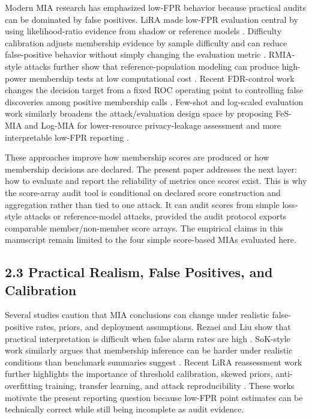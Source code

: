 \documentclass[
  10pt,
  twocolumn]{article}
\begin{document}
Modern MIA research has emphasized low-FPR behavior because practical audits can be dominated by false positives. LiRA made low-FPR evaluation central by using likelihood-ratio evidence from shadow or reference models \cite{ref-3}. Difficulty calibration adjusts membership evidence by sample difficulty and can reduce false-positive behavior without simply changing the evaluation metric \cite{ref-4}. RMIA-style attacks further show that reference-population modeling can produce high-power membership tests at low computational cost \cite{ref-5}. Recent FDR-control work changes the decision target from a fixed ROC operating point to controlling false discoveries among positive membership calls \cite{ref-19}. Few-shot and log-scaled evaluation work similarly broadens the attack/evaluation design space by proposing FeS-MIA and Log-MIA for lower-resource privacy-leakage assessment and more interpretable low-FPR reporting \cite{ref-23}.

These approaches improve how membership scores are produced or how membership decisions are declared. The present paper addresses the next layer: how to evaluate and report the reliability of metrics once scores exist. This is why the score-array audit tool is conditional on declared score construction and aggregation rather than tied to one attack. It can audit scores from simple loss-style attacks or reference-model attacks, provided the audit protocol exports comparable member/non-member score arrays. The empirical claims in this manuscript remain limited to the four simple score-based MIAs evaluated here.

\hypertarget{practical-realism-false-positives-and-calibration}{%
\subsection{2.3 Practical Realism, False Positives, and Calibration}\label{practical-realism-false-positives-and-calibration}}

Several studies caution that MIA conclusions can change under realistic false-positive rates, priors, and deployment assumptions. Rezaei and Liu show that practical interpretation is difficult when false alarm rates are high \cite{ref-6}. SoK-style work similarly argues that membership inference can be harder under realistic conditions than benchmark summaries suggest \cite{ref-7}. Recent LiRA reassessment work further highlights the importance of threshold calibration, skewed priors, anti-overfitting training, transfer learning, and attack reproducibility \cite{ref-8}. These works motivate the present reporting question because low-FPR point estimates can be technically correct while still being incomplete as audit evidence.
\end{document}
